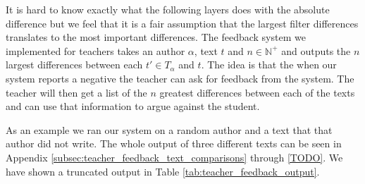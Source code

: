 It is hard to know exactly what the following layers does with the absolute
difference but we feel that it is a fair assumption that the largest filter
differences translates to the most important differences. The feedback system
we implemented for teachers takes an author $\alpha$, text $t$ and $n \in
\mathbb{N}^+$ and outputs the $n$ largest differences between each $t' \in
T_\alpha$ and $t$. The idea is that the when our system reports a negative the
teacher can ask for feedback from the system. The teacher will then get a list
of the $n$ greatest differences between each of the texts and can use that
information to argue against the student.

As an example we ran our system on a random author and a text that that author
did not write. The whole output of three different texts can be seen in Appendix
\ref{subsec:teacher_feedback_text_comparisons} through \ref{TODO}. We have shown
a truncated output in Table \ref{tab:teacher_feedback_output}.

